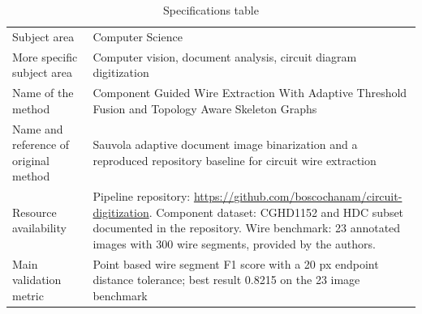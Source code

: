 \begin{table}[H]
\centering
\caption{Specifications table}
\begin{tabularx}{\textwidth}{>{\raggedright\arraybackslash}p{}X}
\toprule
Subject area & Computer Science \\
More specific subject area & Computer vision, document analysis, circuit diagram digitization \\
Name of the method & Component Guided Wire Extraction With Adaptive Threshold Fusion and Topology Aware Skeleton Graphs \\
Name and reference of original method & Sauvola adaptive document image binarization \cite{Sauvola2000} and a reproduced repository baseline for circuit wire extraction \\
Resource availability & Pipeline repository: \url{https://github.com/boscochanam/circuit-digitization}. Component dataset: CGHD1152 and HDC subset documented in the repository. Wire benchmark: 23 annotated images with 300 wire segments, provided by the authors. \\
Main validation metric & Point based wire segment F1 score with a 20 px endpoint distance tolerance; best result 0.8215 on the 23 image benchmark \\
\bottomrule
\end{tabularx}
\end{table}
